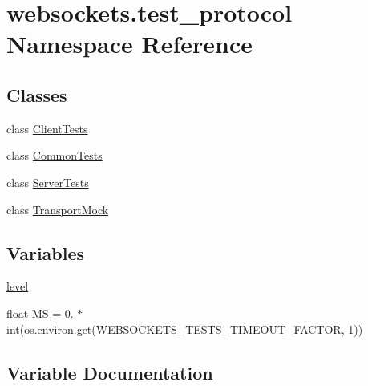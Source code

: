 \hypertarget{namespacewebsockets_1_1test__protocol}{}\section{websockets.\+test\+\_\+protocol Namespace Reference}
\label{namespacewebsockets_1_1test__protocol}
\subsection*{Classes}
\begin{DoxyCompactItemize}
\item 
class \hyperlink{classwebsockets_1_1test__protocol_1_1_client_tests}{Client\+Tests}
\item 
class \hyperlink{classwebsockets_1_1test__protocol_1_1_common_tests}{Common\+Tests}
\item 
class \hyperlink{classwebsockets_1_1test__protocol_1_1_server_tests}{Server\+Tests}
\item 
class \hyperlink{classwebsockets_1_1test__protocol_1_1_transport_mock}{Transport\+Mock}
\end{DoxyCompactItemize}
\subsection*{Variables}
\begin{DoxyCompactItemize}
\item 
\hyperlink{namespacewebsockets_1_1test__protocol_a220eaab35805a876e91b8a4370e2526f}{level}
\item 
float \hyperlink{namespacewebsockets_1_1test__protocol_aacec3c5cf1de6c50c0e4aea95c685d9d}{MS} = 0. $\ast$ int(os.\+environ.\+get(\textquotesingle{}W\+E\+B\+S\+O\+C\+K\+E\+T\+S\+\_\+\+T\+E\+S\+T\+S\+\_\+\+T\+I\+M\+E\+O\+U\+T\+\_\+\+F\+A\+C\+T\+OR\textquotesingle{}, 1))
\end{DoxyCompactItemize}


\subsection{Variable Documentation}
\mbox{\label{namespacewebsockets_1_1test__protocol_a220eaab35805a876e91b8a4370e2526f}} 
